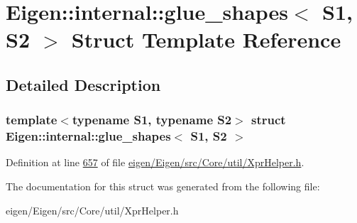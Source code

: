 \hypertarget{struct_eigen_1_1internal_1_1glue__shapes}{}\section{Eigen\+:\+:internal\+:\+:glue\+\_\+shapes$<$ S1, S2 $>$ Struct Template Reference}
\label{struct_eigen_1_1internal_1_1glue__shapes}


\subsection{Detailed Description}
\subsubsection*{template$<$typename S1, typename S2$>$\newline
struct Eigen\+::internal\+::glue\+\_\+shapes$<$ S1, S2 $>$}



Definition at line \hyperlink{eigen_2_eigen_2src_2_core_2util_2_xpr_helper_8h_source_l00657}{657} of file \hyperlink{eigen_2_eigen_2src_2_core_2util_2_xpr_helper_8h_source}{eigen/\+Eigen/src/\+Core/util/\+Xpr\+Helper.\+h}.



The documentation for this struct was generated from the following file\+:\begin{DoxyCompactItemize}
\item 
eigen/\+Eigen/src/\+Core/util/\+Xpr\+Helper.\+h\end{DoxyCompactItemize}
